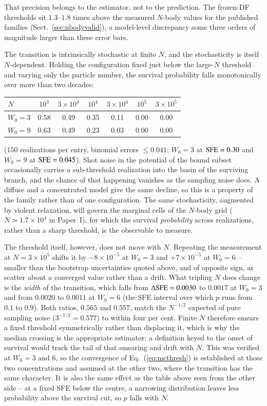 \documentclass{aa}
\newcommand{\sfe}{{\rm SFE}}
\begin{document}
That precision belongs to the estimator, not to the prediction. The
frozen-DF thresholds sit $1.3$--$1.8$ times above the measured $N$-body
values for the published families (Sect.~\ref{sec:nbodyvalid}), a
model-level discrepancy some three orders of magnitude larger than these
error bars.

The transition is intrinsically stochastic at finite $N$, and the
stochasticity is itself $N$-dependent. Holding the configuration fixed
just below the large-$N$ threshold and varying only the particle number,
the survival probability falls monotonically over more than two decades:

\begin{center}
\begin{tabular}{lcccccc}
\hline\hline
$N$ & $10^3$ & $3\times10^3$ & $10^4$ & $3\times10^4$ & $10^5$ & $3\times10^5$\\
\hline
$W_0=3$  & 0.58 & 0.49 & 0.35 & 0.11 & 0.00 & 0.00\\
$W_0=9$  & 0.63 & 0.49 & 0.23 & 0.03 & 0.00 & 0.00\\
\hline
\end{tabular}
\end{center}

\noindent
($150$ realizations per entry, binomial errors $\le0.041$; $W_0=3$ at
$\sfe=0.30$ and $W_0=9$ at $\sfe=0.045$). Shot noise in the potential of
the bound subset occasionally carries a sub-threshold realization into
the basin of the surviving branch, and the chance of that happening
vanishes as the sampling noise does. A diffuse and a concentrated model
give the same decline, so this is a property of the family rather than
of one configuration. The same stochasticity, augmented by violent
relaxation, will govern the marginal cells of the $N$-body grid
($N\simeq1.7\times10^4$ in Paper~I), for which the survival
\emph{probability} across realizations, rather than a sharp threshold,
is the observable to measure.

The threshold itself, however, does not move with $N$. Repeating the
measurement at $N=3\times10^5$ shifts it by $-8\times10^{-5}$ at $W_0=3$
and $+7\times10^{-5}$ at $W_0=6$ -- smaller than the bootstrap
uncertainties quoted above, and of opposite sign, as scatter about a
converged value rather than a drift. What tripling $N$ does change is the
\emph{width} of the transition, which falls from $\Delta\sfe=0.0030$ to
$0.0017$ at $W_0=3$ and from $0.0020$ to $0.0011$ at $W_0=6$ (the SFE
interval over which $p$ runs from $0.1$ to $0.9$). Both ratios, $0.565$
and $0.557$, match the $N^{-1/2}$ expected of pure sampling noise
($3^{-1/2}=0.577$) to within four per cent. Finite $N$ therefore smears a
fixed threshold symmetrically rather than displacing it, which is why the
median crossing is the appropriate estimator: a definition keyed to the
onset of survival would track the tail of that smearing and drift with
$N$. This was verified at $W_0=3$ and $6$, so the convergence of
Eq.~(\ref{eq:mcthresh}) is established at those two concentrations and
assumed at the other two, where the transition has the same character. It
is
also the same effect as the table above seen from the other side -- at a
fixed SFE below the centre, a narrowing distribution leaves less
probability above the survival cut, so $p$ falls with $N$.
\end{document}

